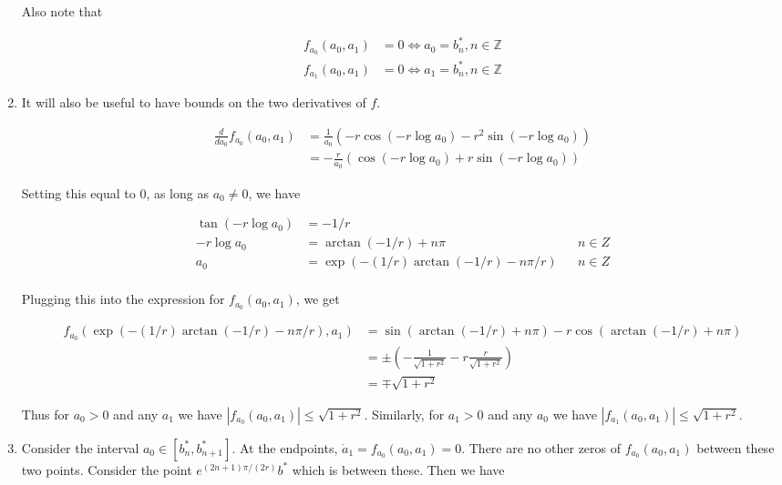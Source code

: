 \documentclass[12pt]{article}
\def\Z{{\mathbb Z}}
\begin{document}
\begin{enumerate}
Also note that 

\begin{align*}
f_{a_0}(a_0, a_1) &= 0 \iff a_0 = b^*_n, n \in \Z \\
f_{a_1}(a_0, a_1) &= 0 \iff a_1 = b^*_n, n \in \Z
\end{align*}

\item It will also be useful to have bounds on the two derivatives of $f$.

\begin{align*}
\frac{d}{d a_0}f_{a_0}(a_0, a_1) &= \frac{1}{a_0} \left(-r \cos(-r \log a_0) - r^2 \sin( -r \log a_0 ) \right) \\
&= -\frac{r}{a_0} \left(\cos(-r \log a_0) + r \sin( -r \log a_0 ) \right)
\end{align*}

Setting this equal to 0, as long as $a_0 \neq 0$, we have

\begin{align*}
\tan(-r \log a_0) &= -1/r \\
-r \log a_0 &= \arctan(-1/r) + n \pi && n \in Z \\
a_0 &= \exp\left( -(1/r) \arctan(-1/r) - n \pi/r \right) && n \in Z \\
\end{align*}

Plugging this into the expression for $f_{a_0}(a_0, a_1)$, we get

\begin{align*}
f_{a_0}(\exp(-(1/r) \arctan(-1/r) - n \pi/r), a_1) &=
\sin(\arctan(-1/r) + n \pi) - r \cos(\arctan(-1/r) + n \pi) \\
&= \pm \left( -\frac{1}{\sqrt{1 + r^2}} - r \frac{r}{\sqrt{1 + r^2}} \right) \\
&= \mp \sqrt{1 + r^2}
\end{align*}

Thus for $a_0 > 0$ and any $a_1$ we have $|f_{a_0}(a_0, a_1)| \leq \sqrt{1 + r^2}$. Similarly, for $a_1 > 0$ and any $a_0$ we have $|f_{a_1}(a_0, a_1)| \leq \sqrt{1 + r^2}$. 

\item Consider the interval $a_0 \in [b^*_n, b^*_{n+1}]$. At the endpoints, $\dot a_1 = f_{a_0}(a_0, a_1) = 0$. There are no other zeros of $f_{a_0}(a_0, a_1)$ between these two points. Consider the point $e^{(2n+1)\pi/(2r) }b^*$ which is between these. Then we have


\end{enumerate}
\end{document}

